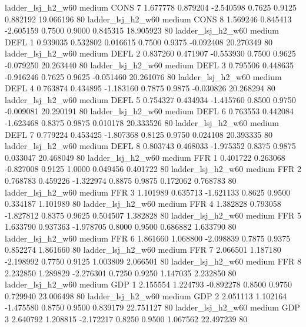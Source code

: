      ladder_lsj_h2_w60     medium     CONS                 7  1.677778 0.879204 -2.540598 0.7625 0.9125  0.882192   19.066196 80
     ladder_lsj_h2_w60     medium     CONS                 8  1.569246 0.845413 -2.605159 0.7500 0.9000  0.845315   18.905923 80
     ladder_lsj_h2_w60     medium     DEFL                 1  0.939035 0.532802  0.016615 0.7500 0.9375 -0.092408   20.270349 80
     ladder_lsj_h2_w60     medium     DEFL                 2  0.837260 0.471907 -0.553930 0.7500 0.9625 -0.079250   20.263440 80
     ladder_lsj_h2_w60     medium     DEFL                 3  0.795506 0.448635 -0.916246 0.7625 0.9625 -0.051460   20.261076 80
     ladder_lsj_h2_w60     medium     DEFL                 4  0.763874 0.434895 -1.183160 0.7875 0.9875 -0.030826   20.268294 80
     ladder_lsj_h2_w60     medium     DEFL                 5  0.754327 0.434934 -1.415760 0.8500 0.9750 -0.009081   20.290191 80
     ladder_lsj_h2_w60     medium     DEFL                 6  0.763553 0.442084 -1.623468 0.8375 0.9875  0.010178   20.333526 80
     ladder_lsj_h2_w60     medium     DEFL                 7  0.779224 0.453425 -1.807368 0.8125 0.9750  0.024108   20.393335 80
     ladder_lsj_h2_w60     medium     DEFL                 8  0.803743 0.468033 -1.975352 0.8375 0.9875  0.033047   20.468049 80
     ladder_lsj_h2_w60     medium      FFR                 1  0.401722 0.263068 -0.827008 0.9125 1.0000  0.049456    0.401722 80
     ladder_lsj_h2_w60     medium      FFR                 2  0.768783 0.459226 -1.322974 0.8875 0.9875  0.172062    0.768783 80
     ladder_lsj_h2_w60     medium      FFR                 3  1.101989 0.635713 -1.621133 0.8625 0.9500  0.334187    1.101989 80
     ladder_lsj_h2_w60     medium      FFR                 4  1.382828 0.793058 -1.827812 0.8375 0.9625  0.504507    1.382828 80
     ladder_lsj_h2_w60     medium      FFR                 5  1.633790 0.937363 -1.978705 0.8000 0.9500  0.686882    1.633790 80
     ladder_lsj_h2_w60     medium      FFR                 6  1.861660 1.068800 -2.098839 0.7875 0.9375  0.852274    1.861660 80
     ladder_lsj_h2_w60     medium      FFR                 7  2.066501 1.187180 -2.198992 0.7750 0.9125  1.003809    2.066501 80
     ladder_lsj_h2_w60     medium      FFR                 8  2.232850 1.289829 -2.276301 0.7250 0.9250  1.147035    2.232850 80
     ladder_lsj_h2_w60     medium      GDP                 1  2.155554 1.224793 -0.892278 0.8500 0.9750  0.729940   23.006498 80
     ladder_lsj_h2_w60     medium      GDP                 2  2.051113 1.102164 -1.475580 0.8750 0.9500  0.839179   22.751127 80
     ladder_lsj_h2_w60     medium      GDP                 3  2.640792 1.208815 -2.172217 0.8250 0.9500  1.067562   22.497239 80
